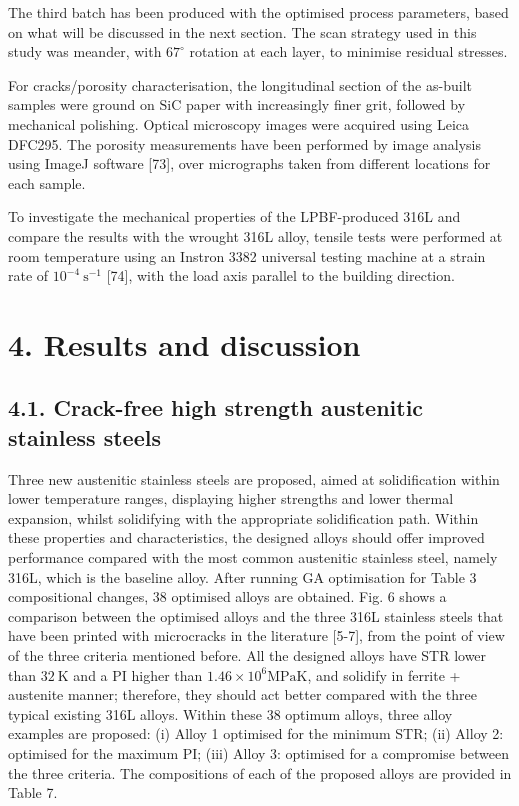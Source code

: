 \documentclass[10pt]{article}
\begin{document}
The third batch has been produced with the optimised process parameters, based on what will be discussed in the next section. The scan strategy used in this study was meander, with $67^{\circ}$ rotation at each layer, to minimise residual stresses.

For cracks/porosity characterisation, the longitudinal section of the as-built samples were ground on $\mathrm{SiC}$ paper with increasingly finer grit, followed by mechanical polishing. Optical microscopy images were acquired using Leica DFC295. The porosity measurements have been performed by image analysis using ImageJ software [73], over micrographs taken from different locations for each sample.

To investigate the mechanical properties of the LPBF-produced 316L and compare the results with the wrought 316L alloy, tensile tests were performed at room temperature using an Instron 3382 universal testing machine at a strain rate of $10^{-4} \mathrm{~s}^{-1}$ [74], with the load axis parallel to the building direction.

\section*{4. Results and discussion}
\subsection*{4.1. Crack-free high strength austenitic stainless steels}
Three new austenitic stainless steels are proposed, aimed at solidification within lower temperature ranges, displaying higher strengths and lower thermal expansion, whilst solidifying with the appropriate solidification path. Within these properties and characteristics, the designed alloys should offer improved performance compared with the most common austenitic stainless steel, namely 316L, which is the baseline alloy. After running GA optimisation for Table 3 compositional changes, 38 optimised alloys are obtained. Fig. 6 shows a comparison between the optimised alloys and the three 316L stainless steels that have been printed with microcracks in the literature [5-7], from the point of view of the three criteria mentioned before. All the designed alloys have STR lower than $32 \mathrm{~K}$ and a PI higher than $1.46 \times 10^{6} \mathrm{MPa} \mathrm{K}$, and solidify in ferrite + austenite manner; therefore, they should act better compared with the three typical existing 316L alloys. Within these 38 optimum alloys, three alloy examples are proposed: (i) Alloy 1 optimised for the minimum STR; (ii) Alloy 2: optimised for the maximum PI; (iii) Alloy 3: optimised for a compromise between the three criteria. The compositions of each of the proposed alloys are provided in Table 7.
\end{document}
